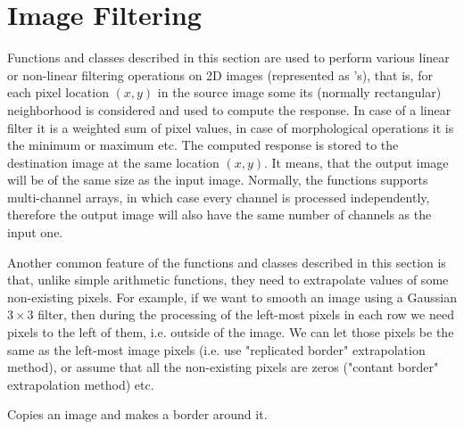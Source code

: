 \section{Image Filtering}

Functions and classes described in this section are used to perform various linear or non-linear filtering operations on 2D images (represented as 's), that is, for each pixel location $(x,y)$ in the source image some its (normally rectangular) neighborhood is considered and used to compute the response. In case of a linear filter it is a weighted sum of pixel values, in case of morphological operations it is the minimum or maximum etc. The computed response is stored to the destination image at the same location $(x,y)$. It means, that the output image will be of the same size as the input image. Normally, the functions supports multi-channel arrays, in which case every channel is processed independently, therefore the output image will also have the same number of channels as the input one.

Another common feature of the functions and classes described in this section is that, unlike simple arithmetic functions, they need to extrapolate values of some non-existing pixels. For example, if we want to smooth an image using a Gaussian $3 \times 3$ filter, then during the processing of the left-most pixels in each row we need pixels to the left of them, i.e. outside of the image. We can let those pixels be the same as the left-most image pixels (i.e. use "replicated border" extrapolation method), or assume that all the non-existing pixels are zeros ("contant border" extrapolation method) etc. 

\ifCPy

Copies an image and makes a border around it.



